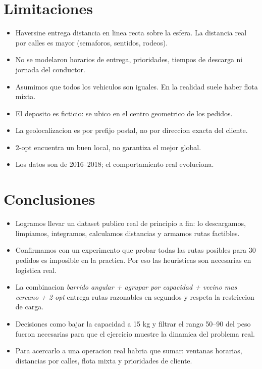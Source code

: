\documentclass[11pt,a4paper]{article}
\begin{document}
\section{Limitaciones}
\begin{itemize}[leftmargin=*,nosep]
  \item Haversine entrega distancia en linea recta sobre la esfera. La
        distancia real por calles es mayor (semaforos, sentidos,
        rodeos).
  \item No se modelaron horarios de entrega, prioridades, tiempos de
        descarga ni jornada del conductor.
  \item Asumimos que todos los vehiculos son iguales. En la realidad
        suele haber flota mixta.
  \item El deposito es ficticio: se ubico en el centro geometrico de
        los pedidos.
  \item La geolocalizacion es por prefijo postal, no por direccion
        exacta del cliente.
  \item 2-opt encuentra un buen local, no garantiza el mejor global.
  \item Los datos son de 2016--2018; el comportamiento real evoluciona.
\end{itemize}

\section{Conclusiones}
\begin{itemize}[leftmargin=*,nosep]
  \item Logramos llevar un dataset publico real de principio a fin: lo
        descargamos, limpiamos, integramos, calculamos distancias y
        armamos rutas factibles.
  \item Confirmamos con un experimento que probar todas las rutas
        posibles para 30 pedidos es imposible en la practica. Por eso
        las heuristicas son necesarias en logistica real.
  \item La combinacion \emph{barrido angular + agrupar por capacidad +
        vecino mas cercano + 2-opt} entrega rutas razonables en
        segundos y respeta la restriccion de carga.
  \item Decisiones como bajar la capacidad a 15 kg y filtrar el rango
        50--90 del peso fueron necesarias para que el ejercicio
        muestre la dinamica del problema real.
  \item Para acercarlo a una operacion real habria que sumar:
        ventanas horarias, distancias por calles, flota mixta y
        prioridades de cliente.
\end{itemize}
\end{document}
